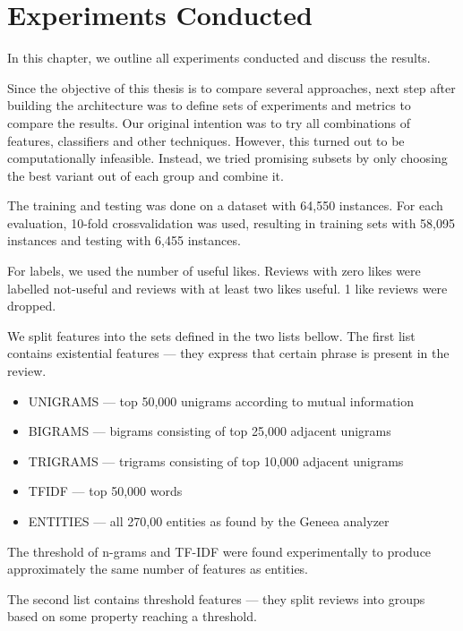 \chapter{Experiments Conducted}\label{chap:exp}

In this chapter, we outline all experiments conducted and discuss the results.

Since the objective of this thesis is to compare several approaches,
next step after building the architecture was to define sets of experiments and metrics to compare the results.
Our original intention was to try all combinations of features, classifiers and other techniques.
However, this turned out to be computationally infeasible.
Instead, we tried promising subsets by only choosing the best variant out of each group and combine it.

The training and testing was done on a dataset with 64,550 instances.
For each evaluation, 10-fold crossvalidation was used, resulting in
training sets with 58,095 instances and testing with 6,455 instances.

For labels, we used the number of useful likes.
Reviews with zero likes were labelled not-useful and
reviews with at least two likes useful.
1 like reviews were dropped.

We split features into the sets defined in the two lists bellow.
The first list contains existential features --- they express that certain phrase is present in the review.

\begin{itemize}
	\item UNIGRAMS --- top 50,000 unigrams according to mutual information
	\item BIGRAMS --- bigrams consisting of top 25,000 adjacent unigrams
	\item TRIGRAMS  --- trigrams consisting of top 10,000 adjacent unigrams
	\item TFIDF  --- top 50,000 words
	\item ENTITIES --- all 270,00 entities as found by the Geneea analyzer
\end{itemize}

The threshold of n-grams and TF-IDF were found experimentally to produce approximately the same number of features as entities.

The second list contains threshold features --- they split reviews into groups based on some property reaching a threshold.

